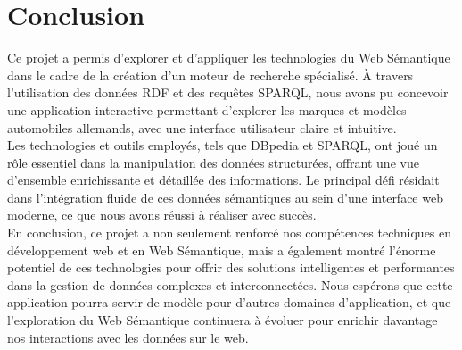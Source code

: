 \documentclass[a4paper]{article}
\begin{document}
\section{Conclusion}
Ce projet a permis d'explorer et d'appliquer les technologies du Web Sémantique dans le cadre de la création d'un moteur de recherche spécialisé. À travers l'utilisation des données RDF et des requêtes SPARQL, nous avons pu concevoir une application interactive permettant d'explorer les marques et modèles automobiles allemands, avec une interface utilisateur claire et intuitive. \\

Les technologies et outils employés, tels que DBpedia et SPARQL, ont joué un rôle essentiel dans la manipulation des données structurées, offrant une vue d'ensemble enrichissante et détaillée des informations. Le principal défi résidait dans l'intégration fluide de ces données sémantiques au sein d'une interface web moderne, ce que nous avons réussi à réaliser avec succès. \\

En conclusion, ce projet a non seulement renforcé nos compétences techniques en développement web et en Web Sémantique, mais a également montré l'énorme potentiel de ces technologies pour offrir des solutions intelligentes et performantes dans la gestion de données complexes et interconnectées. Nous espérons que cette application pourra servir de modèle pour d'autres domaines d'application, et que l'exploration du Web Sémantique continuera à évoluer pour enrichir davantage nos interactions avec les données sur le web.
\end{document}

